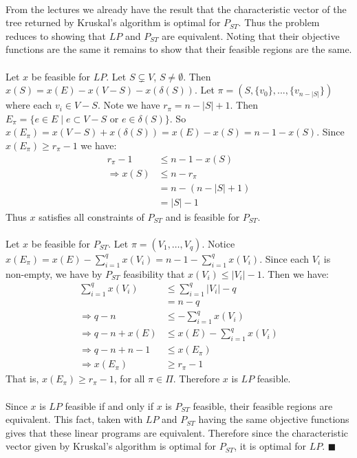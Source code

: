 \documentclass[letterpaper,12pt,oneside,onecolumn]{report}
\begin{document}
\paragraph{}
From the lectures we already have the result that the characteristic vector of the tree returned by Kruskal's algorithm is optimal for $P_{ST}$. Thus the problem reduces to showing that $LP$ and $P_{ST}$ are equivalent. Noting that their objective functions are the same it remains to show that their feasible regions are the same.
\paragraph{}
Let $x$ be feasible for $LP$. Let $S \subsetneq V$, $S \neq \emptyset$. Then $x(S) = x(E) - x(V-S) - x(\delta(S))$.  Let $\pi = (S, \{v_0\}, ..., \{v_{n-|S|}\})$ where each $v_i \in V - S$. Note we have $r_\pi = n - |S| + 1$. Then $E_{\pi} = \{ e \in E \mid e \subset V-S \text{ or } e \in \delta(S) \}$. So $x(E_\pi) = x(V-S) + x(\delta(S)) = x(E) - x(S) = n - 1 - x(S)$. Since $x(E_\pi) \geq r_\pi - 1$ we have:
\begin{align*}
r_\pi - 1 &\leq n - 1 - x(S) \\
\Rightarrow x(S) &\leq n - r_\pi\\\
&= n - (n - |S| +1) \\
&= |S| -1
\end{align*} 
Thus $x$ satisfies all constraints of $P_{ST}$ and is feasible for $P_{ST}$.
\paragraph{}
Let $x$ be feasible for $P_{ST}$. Let $\pi = (V_1, \dots, V_q)$. Notice $x(E_\pi) = x(E) - \sum_{i=1}^q x(V_i) = n - 1 - \sum_{i=1}^qx(V_i)$. Since each $V_i$ is non-empty, we have by $P_{ST}$ feasibility that $x(V_i) \leq |V_i| -1$. Then we have:
\begin{align*}
\sum_{i=1}^qx(V_i) &\leq \sum_{i=1}^q|V_i| - q \\
&= n - q\\
\Rightarrow q - n &\leq - \sum_{i=1}^qx(V_i) \\
\Rightarrow q - n + x(E) &\leq x(E) - \sum_{i=1}^qx(V_i)\\
\Rightarrow q - n + n -1 &\leq x(E_\pi) \\
\Rightarrow x(E_\pi) &\geq r_\pi -1
\end{align*}
That is, $x(E_\pi) \geq r_\pi - 1$, for all $\pi \in \Pi$. Therefore $x$ is $LP$ feasible.
\paragraph{}
Since $x$ is $LP$ feasible if and only if $x$ is $P_{ST}$ feasible, their feasible regions are equivalent. This fact, taken with $LP$ and $P_{ST}$ having the same objective functions gives that these linear programs are equivalent. Therefore since the characteristic vector given by Kruskal's algorithm is optimal for $P_{ST}$, it is optimal for $LP$. $\blacksquare$
\end{document}
